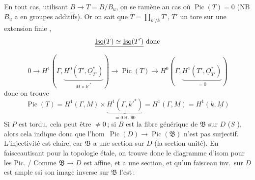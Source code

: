 \documentclass[11pt,a4paper]{article}
\begin{document}
En tout cas, utilisant  $B\to T=B/B_u$, on se ramène au
cas où $\operatorname{Pic}(T)=0$ (NB $B_u$ a
 en groupes additifs). Or on sait que
$T=\prod_{k'/k}T'$, $T'$ un tore sur une extension 
finie , 
\[
  \struck{\underline{\mathrm{Iso}}(T)\simeq\underline{\mathrm{Iso}}(T')}
  \ \text{donc}
\]
\[
  0\to H^1(\Gamma,\underbrace{H^0(T',\underline{O}^{*}_{T'})}_{M\times k'^{*}})
  \to\operatorname{Pic}(T)\to
  H^0(\Gamma,\underbrace{H^1(T',\underline{O}^{*}_{T'})}_{=0})
\]
donc on trouve
\[
  \operatorname{Pic}(T)=H^1(\Gamma,M)\times
  \underbrace{H^1(\Gamma,k'^{*})}_{=0\ \text{H.~90}}
  =H^1(\Gamma,M)=H^1(k,\underline{M})
\]
Si $P$ est tordu, cela peut être $\neq 0$\,; si $B$ est la fibre générique de
$\mathfrak{B}$ sur $D$ ($S$ ), alors cela indique donc que
l'hom\ $\operatorname{Pic}(D)\to\operatorname{Pic}(\mathfrak{B})$ n'est pas
surjectif. L'injectivité est claire, car $\mathfrak{B}$ a une section sur $D$
(la section unité). En faisceautisant pour la topologie étale, on trouve donc
le diagramme d'isom pour les $\underline{\mathrm{Pic}}$. / Comme
$\mathfrak{B}\to D$ est affine, et a une section, \ill{} et
 qu'un faisceau inv.\ sur $D$ est ample ssi son image
inverse sur $\mathfrak{B}$ l'est\,:

\end{document}
